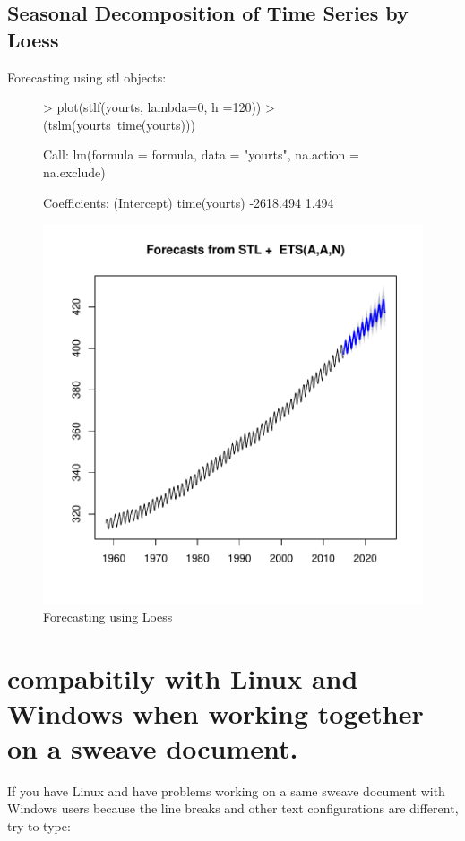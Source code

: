 \documentclass[11pt, a4paper]{article} %
\begin{document}
\subsection{Seasonal Decomposition of Time Series by Loess}

Forecasting using stl objects:
\begin{figure}[H]
\centering
\begin{Schunk}
\begin{Sinput}
> plot(stlf(yourts, lambda=0, h =120))
> (tslm(yourts~time(yourts)))
\end{Sinput}
\begin{Soutput}
Call:
lm(formula = formula, data = "yourts", na.action = na.exclude)

Coefficients:
 (Intercept)  time(yourts)  
   -2618.494         1.494  
\end{Soutput}
\end{Schunk}
\includegraphics{alleselena-065}
\caption{Forecasting using Loess}
\end{figure}




\section{compabitily with Linux and Windows when working together on a sweave document.}
If you have Linux and have problems working on a same sweave document with Windows users because the line breaks and other text configurations are different, try to type:
\end{document}
